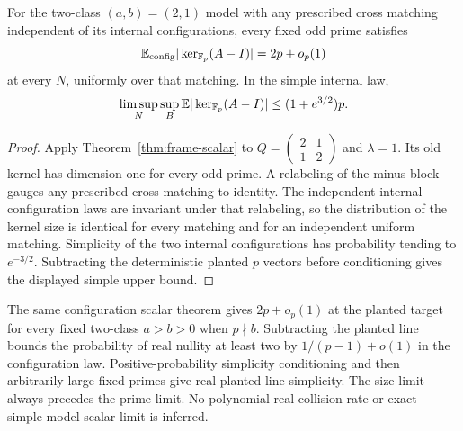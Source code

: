 \begin{corollary}
\label{thm:cubic-raw}
For the two-class $(a,b)=(2,1)$ model with any prescribed cross
matching independent of its internal configurations, every fixed odd
prime satisfies
\[
 \mathbb E_{\rm config}|\ker_{\mathbb F_p}(A-I)|=2p+o_p(1)
\]
at every $N$, uniformly over that matching. In the simple internal law,
\[
 \limsup_N\sup_B\mathbb E|\ker_{\mathbb F_p}(A-I)|\le(1+e^{3/2})p.
\]
\end{corollary}
\begin{proof}
Apply Theorem~\ref{thm:frame-scalar} to
$Q=\left(\begin{smallmatrix}2&1\\1&2\end{smallmatrix}\right)$ and
$\lambda=1$. Its old kernel has dimension one for every odd prime.
A relabeling of the minus block gauges any prescribed cross matching
to identity. The independent internal configuration laws are invariant
under that relabeling, so the distribution of the kernel size is
identical for every matching and for an independent uniform matching.
Simplicity of the two internal configurations has probability tending
to $e^{-3/2}$. Subtracting the deterministic planted $p$ vectors before
conditioning gives the displayed simple upper bound.
\end{proof}

The same configuration scalar theorem gives $2p+o_p(1)$ at the planted
target for every fixed two-class $a>b>0$ when $p\nmid b$.
Subtracting the planted line bounds the probability of real nullity
at least two by $1/(p-1)+o(1)$ in the configuration law.
Positive-probability simplicity conditioning and then arbitrarily
large fixed primes give real planted-line simplicity.
The size limit always precedes the prime limit. No polynomial
real-collision rate or exact simple-model scalar limit is inferred.

